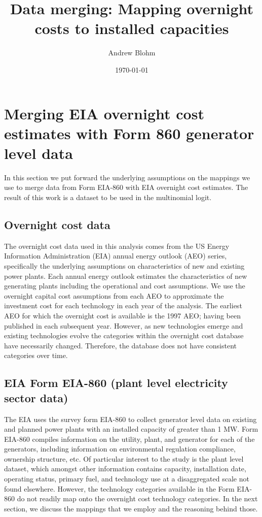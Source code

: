 \documentclass[10pt]{amsart}
\title{Data merging: Mapping overnight costs to installed capacities}
\author{Andrew Blohm}
\date{\today}
\begin{document}
\maketitle

\section{Merging EIA overnight cost estimates with Form 860 generator level data}
In this section we put forward the underlying assumptions on the mappings we use to merge data from Form EIA-860 with EIA overnight cost estimates.
The result of this work is a dataset to be used in the multinomial logit.

\subsection{Overnight cost data}
The overnight cost data used in this analysis comes from the US Energy Information Administration (EIA) annual energy outlook (AEO) series, specifically the underlying assumptions on characteristics of new and existing power plants. 
Each annual energy outlook estimates the characteristics of new generating plants including the operational and cost assumptions.
We use the overnight capital cost assumptions from each AEO to approximate the investment cost for each technology in each year of the analysis.
The earliest AEO for which the overnight cost is available is the 1997 AEO; having been published in each subsequent year.
However, as new technologies emerge and existing technologies evolve the categories within the overnight cost database have necessarily changed. 
Therefore, the database does not have consistent categories over time. 

\subsection{EIA Form EIA-860 (plant level electricity sector data)}
The EIA uses the survey form EIA-860 to collect generator level data on existing and planned power plants with an installed capacity of greater than 1 MW. 
Form EIA-860 compiles information on the utility, plant, and generator for each of the generators, including information on environmental regulation compliance, ownership structure, etc.  
Of particular interest to the study is the plant level dataset, which amongst other information contains capacity, installation date, operating status, primary fuel, and technology use at a disaggregated scale not found elsewhere.
However, the technology categories available in the Form EIA-860 do not readily map onto the overnight cost technology categories. 
In the next section, we discuss the mappings that we employ and the reasoning behind those. 
\end{document}
